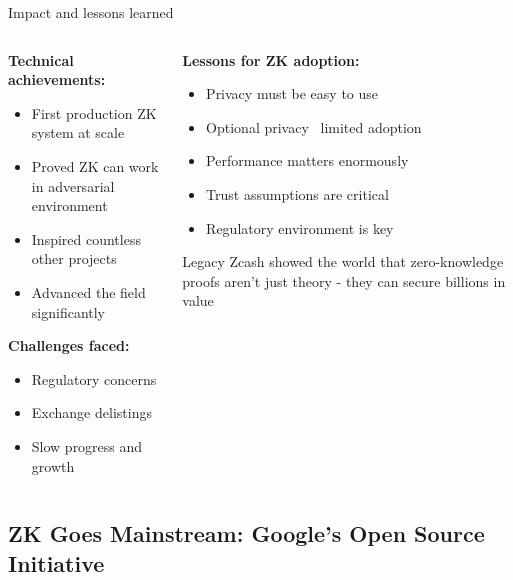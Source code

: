 \documentclass[aspectratio=169, lualatex, handout]{beamer}
\begin{document}
\begin{frame}{Impact and lessons learned}
	\begin{columns}[c]
		\begin{column}{0.5\textwidth}
			\textbf{Technical achievements:}
			\begin{itemize}
				\item First production ZK system at scale
				\item Proved ZK can work in adversarial environment
				\item Inspired countless other projects
				\item Advanced the field significantly
			\end{itemize}
			\vspace{0.5em}
			\textbf{Challenges faced:}
			\begin{itemize}
				\item Regulatory concerns
				\item Exchange delistings
				\item Slow progress and growth
			\end{itemize}
		\end{column}
		\begin{column}{0.5\textwidth}
			\textbf{Lessons for ZK adoption:}
			\begin{itemize}
				\item Privacy must be easy to use
				\item Optional privacy \rightarrow\ limited adoption
				\item Performance matters enormously
				\item Trust assumptions are critical
				\item Regulatory environment is key
			\end{itemize}
			\vspace{0.5em}
			\begin{exampleblock}{Legacy}
				Zcash showed the world that zero-knowledge proofs aren't just theory - they can secure billions in value
			\end{exampleblock}
		\end{column}
	\end{columns}
\end{frame}

\subsection{ZK Goes Mainstream: Google's Open Source Initiative}
\end{document}
